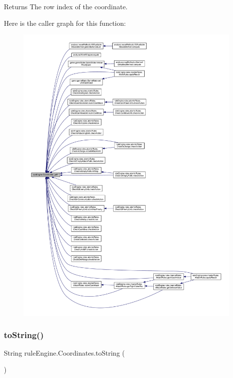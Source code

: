 \begin{DoxyReturn}{Returns}
The row index of the coordinate. 
\end{DoxyReturn}
Here is the caller graph for this function\+:
\nopagebreak
\begin{figure}[H]
\begin{center}
\leavevmode
\includegraphics[width=350pt]{classrule_engine_1_1_coordinates_ad14bb7f6ecd9607d8f0110a38c6b3e87_icgraph}
\end{center}
\end{figure}
\mbox{\label{classrule_engine_1_1_coordinates_afb096dd5f3830a32c84b12be4b49fcb7}} 
\subsubsection{\texorpdfstring{to\+String()}{toString()}}
{\footnotesize\ttfamily String rule\+Engine.\+Coordinates.\+to\+String (\begin{DoxyParamCaption}{ }\end{DoxyParamCaption})\hspace{0.3cm}{\ttfamily [inline]}}



